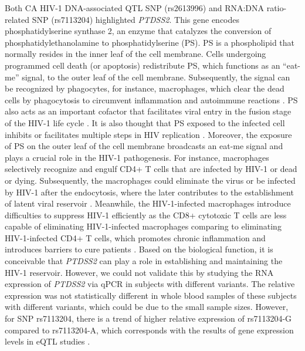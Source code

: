 \documentclass{book}
\begin{document}
\begin{refsection}
Both CA HIV-1 DNA-associated QTL SNP (rs2613996) and RNA:DNA ratio-related SNP (rs7113204) highlighted \textit{PTDSS2}.
This gene encodes phosphatidylserine synthase 2, an enzyme that catalyzes the conversion of phosphatidylethanolamine to phosphatidylserine (PS).
PS is a phospholipid that normally resides in the inner leaf of the cell membrane.
Cells undergoing programmed cell death (or apoptosis) redistribute PS, which functions as an “eat-me” signal, to the outer leaf of the cell membrane.
Subsequently, the signal can be recognized by phagocytes, for instance, macrophages, which clear the dead cells by phagocytosis to circumvent inflammation and autoimmune reactions \cite{Chua2019Roles}.
PS also acts as an important cofactor that facilitates viral entry in the fusion stage of the HIV-1 life cycle \cite{Zaitseva2017Fusion}.
It is also thought that PS exposed to the infected cell inhibits or facilitates multiple steps in HIV replication \cite{Chua2019Roles}.
Moreover, the exposure of PS on the outer leaf of the cell membrane broadcasts an eat-me signal and plays a crucial role in the HIV-1 pathogenesis.
For instance, macrophages selectively recognize and engulf CD4+ T cells that are infected by HIV-1 or dead or dying.
Subsequently, the macrophages could eliminate the virus or be infected by HIV-1 after the endocytosis, where the later contributes to the establishment of latent viral reservoir \cite{Baxter2014Macrophage}.
Meanwhile, the HIV-1-infected macrophages introduce difficulties to suppress HIV-1 efficiently as the CD8+ cytotoxic T cells are less capable of eliminating HIV-1-infected macrophages comparing to eliminating HIV-1-infected CD4+ T cells, which promotes chronic inflammation and introduces barriers to cure patients \cite{Clayton2018Resistance}.
Based on the biological function, it is conceivable that \textit{PTDSS2} can play a role in establishing and maintaining the HIV-1 reservoir.
However, we could not validate this by studying the RNA expression of \textit{PTDSS2} via qPCR in subjects with different variants.
The relative expression was not statistically different in whole blood samples of these subjects with different variants, which could be due to the small sample sizes.
However, for SNP rs7113204, there is a trend of higher relative expression of rs7113204-G compared to rs7113204-A, which corresponds with the results of gene expression levels in eQTL studies \cite{Võsa2018Unraveling}.


\end{refsection}
\end{document}
